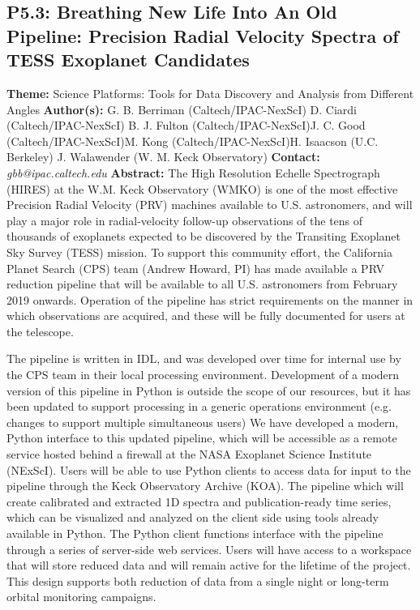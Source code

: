 \documentclass{report}
\begin{document}
{{{{{{{{{{{{{{{{\subsection*{P5.3: Breathing New Life Into An Old Pipeline: Precision Radial Velocity Spectra of TESS Exoplanet Candidates}
{\bf Theme:}  Science Platforms: Tools for Data Discovery and Analysis from Different Angles\newline
{\bf Author(s):}\newline
G. B. Berriman (Caltech/IPAC-NexScI) \newline D. Ciardi (Caltech/IPAC-NexScI) \newline  B. J. Fulton (Caltech/IPAC-NexScI)\newline  J. C. Good (Caltech/IPAC-NexScI)\newline M. Kong (Caltech/IPAC-NexScI)\newline  H. Isaacson (U.C. Berkeley)
J. Walawender (W. M. Keck Observatory)\newline\newline
{\bf Contact:} {\it gbb@ipac.caltech.edu}\newline
\newline\newline
{\bf Abstract:}\newline
The High Resolution Echelle Spectrograph (HIRES) at the W.M. Keck Observatory (WMKO) is one of the most effective Precision Radial Velocity (PRV) machines available to U.S. astronomers, and will play a major role in radial-velocity follow-up observations of the tens of thousands of exoplanets expected to be discovered by the Transiting Exoplanet Sky Survey (TESS) mission.  To support this community effort, the California Planet Search (CPS) team (Andrew Howard, PI) has made available a PRV reduction pipeline that will be available to all U.S. astronomers from February 2019 onwards. Operation of the pipeline has strict requirements on the manner in which observations are acquired, and these will be fully documented for users at the telescope.

The pipeline is written in IDL, and was developed over time for internal use by the CPS team in their local processing environment. Development of a modern version of this pipeline in Python is outside the scope of our resources, but it has been updated to support processing in a generic operations environment (e.g. changes to support multiple simultaneous users) We have developed a modern, Python interface to this updated pipeline, which will be accessible as a remote service hosted behind a firewall at the NASA Exoplanet Science Institute (NExScI).  Users will be able to use Python clients to access data for input to the pipeline through the Keck Observatory Archive (KOA). The pipeline which will create calibrated and extracted 1D spectra and publication-ready time series, which can be visualized and analyzed on the client side using tools already available in Python.   The Python client functions interface with the pipeline through a series of server-side web services. Users will have access to a workspace that will store reduced data and will remain active for the lifetime of the project. This design supports both reduction of data from a single night or long-term orbital monitoring campaigns.

}}}}}}}}}}}}}}}}
\end{document}
